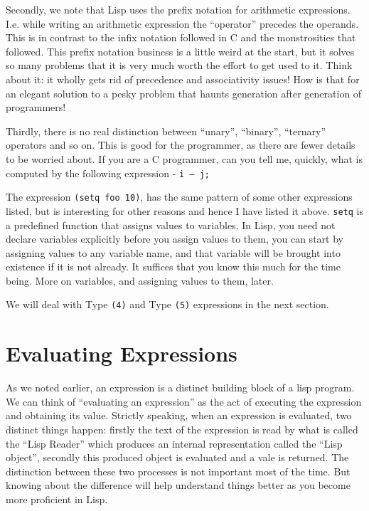 \documentclass[10pt]{article}
\begin{document}
Secondly, we note that Lisp uses the prefix notation for arithmetic
expressions.  I.e. while writing an arithmetic expression the ``operator''
precedes the operands.  This is in contrast to the infix notation followed in C
and the monstrosities that followed.  This prefix notation business is a little
weird at the start, but it solves so many problems that it is very much worth
the effort to get used to it.  Think about it: it wholly gets rid of precedence
and associativity issues!  How is that for an elegant solution to a pesky
problem that haunts generation after generation of programmers!

Thirdly, there is no real distinction between ``unary'', ``binary'',
``ternary'' operators and so on.  This is good for the programmer, as there are
fewer details to be worried about.  If you are a C programmer, can you tell me,
quickly, what is computed by the following expression - \texttt{i --- j;}

The expression \texttt{(setq foo 10)}, has the same pattern of some other
expressions listed, but is interesting for other reasons and hence I have
listed it above.  \texttt{setq} is a predefined function that assigns values to
variables.  In Lisp, you need not declare variables explicitly before you
assign values to them, you can start by assigning values to any variable name,
and that variable will be brought into existence if it is not already.  It
suffices that you know this much for the time being.  More on variables, and
assigning values to them, later.

We will deal with Type \texttt{(4)} and Type \texttt{(5)} expressions in the
next section.

\section{Evaluating Expressions}

As we noted earlier, an expression is a distinct building block of a lisp
program.  We can think of ``evaluating an expression'' as the act of executing
the expression and obtaining its value.  Strictly speaking, when an expression
is evaluated, two distinct things happen: firstly the text of the expression is
read by what is called the ``Lisp Reader'' which produces an internal
representation called the ``Lisp object'', secondly this produced object is
evaluated and a vale is returned.  The distinction between these two processes
is not important most of the time.  But knowing about the difference will help
understand things better as you become more proficient in Lisp.
\end{document}
